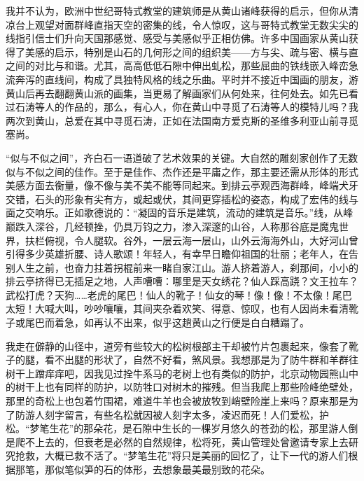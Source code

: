\documentclass{article}
\begin{document}
我并不认为，欧洲中世纪哥特式教堂的建筑师是从黄山诸峰获得的启示，但你从清凉台上观望对面群峰直指天空的密集的线，令人惊叹，这与哥特式教堂无数尖尖的线指引信士们升向天国那感觉、感受与美感似乎正相仿佛。许多中国画家从黄山获得了美感的启示，特别是山石的几何形之间的组织美——方与尖、疏与密、横与直之间的对比与和谐。尤其，高高低低石隙中伸出虬松，那些屈曲的铁线嵌入峰峦急流奔泻的直线间，构成了具独特风格的线之乐曲。平时并不接近中国画的朋友，游黄山后再去翻翻黄山派的画集，当更易了解画家们从何处来，往何处去。如先已看过石涛等人的作品的，那么，有心人，你在黄山中寻觅了石涛等人的模特儿吗？我两次到黄山，总爱在其中寻觅石涛，正如在法国南方爱克斯的圣维多利亚山前寻觅塞尚。

“似与不似之间”，齐白石一语道破了艺术效果的关键。大自然的雕刻家创作了无数似与不似之间的佳作。至于是佳作、杰作还是平庸之作，那主要还需从形体的形式美感方面去衡量，像不像与美不美不能等同起来。到排云亭观西海群峰，峰端犬牙交错，石头的形象有尖有方，或起或伏，其间更穿插松的姿态，构成了宏伟的线与面之交响乐。正如歌德说的：“凝固的音乐是建筑，流动的建筑是音乐。”线，从峰巅跌入深谷，几经顿挫，仍具万钧之力，渗入深邃的山谷，人称那谷底是魔鬼世界，扶栏俯视，令人腿软。谷外，一层云海一层山，山外云海海外山，大好河山曾引得多少英雄折腰、诗人歌颂！年轻人，有幸早日瞻仰祖国的壮丽；老年人，在告别人生之前，也奋力拄着拐棍前来一睹自家江山。游人挤着游人，刹那间，小小的排云亭挤得已无插足之地，人声嘈嘈：哪里是天女绣花？仙人踩高跷？文王拉车？武松打虎？天狗……老虎的尾巴！仙人的靴子！仙女的琴！像！像！不太像！尾巴太短！大喊大叫，吵吵嚷嚷，其间夹杂着欢笑、得意、惊叹，也有人因尚未看清靴子或尾巴而着急，如再认不出来，似乎这趟黄山之行便是白白糟蹋了。

我走在僻静的山径中，道旁有些较大的松树根部主干却被竹片包裹起来，像套了靴子的腿，看不出腿的形状了，自然不好看，煞风景。我想那是为了防牛群和羊群往树干上蹭痒痒吧，因我见过拴牛系马的老树上也有类似的防护，北京动物园熊山中的树干上也有同样的防护，以防牲口对树木的摧残。但当我爬上那些险峰绝壁处，那里的奇松上也包着竹围裙，难道牛羊也会被放牧到峭壁险崖上来吗？原来那是为了防游人刻字留言，有些名松就因被人刻字太多，凌迟而死！人们爱松，护松。“梦笔生花”的那朵花，是石隙中生长的一棵岁月悠久的苍劲的松，那里游人倒是爬不上去的，但衰老是必然的自然规律，松将死，黄山管理处曾邀请专家上去研究抢救，大概已救不活了。“梦笔生花”将只是美丽的回忆了，让下一代的游人们根据那笔，那似笔似笋的石的体形，去想象最美最别致的花朵。
\end{document}
